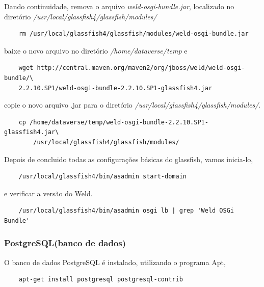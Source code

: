 \documentclass[12pt,hidelinks]{article}
\begin{document}
        Dando continuidade, remova o arquivo \textit{weld-osgi-bundle.jar}, localizado no diretório \textit{/usr/local/glassfish4/glassfish/modules/}
        \begin{verbatim}
    rm /usr/local/glassfish4/glassfish/modules/weld-osgi-bundle.jar
        \end{verbatim}
        baixe o novo arquivo no diretório \textit{/home/dataverse/temp} e 
        \begin{verbatim}
    wget http://central.maven.org/maven2/org/jboss/weld/weld-osgi-bundle/\
    2.2.10.SP1/weld-osgi-bundle-2.2.10.SP1-glassfish4.jar
        \end{verbatim}
        copie o novo arquivo .jar para o diretório \textit{/usr/local/glassfish4/glassfish/modules/}. 
        \begin{verbatim}
    cp /home/dataverse/temp/weld-osgi-bundle-2.2.10.SP1-glassfish4.jar\
        /usr/local/glassfish4/glassfish/modules/
        \end{verbatim}
        
        Depois de concluido todas as configurações básicas do glassfish, vamos inicia-lo,    
        \begin{verbatim} 
    /usr/local/glassfish4/bin/asadmin start-domain
        \end{verbatim}
        e verificar a versão do Weld.
        \begin{verbatim} 
    /usr/local/glassfish4/bin/asadmin osgi lb | grep 'Weld OSGi Bundle'
        \end{verbatim}
        
        
        \subsubsection{PostgreSQL(banco de dados)}
        
        \qquad O banco de dados PostgreSQL é instalado, utilizando o programa Apt, 
        \begin{verbatim} 
    apt-get install postgresql postgresql-contrib
        \end{verbatim}
        
\end{document}
